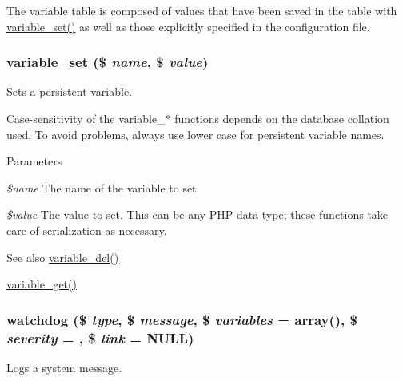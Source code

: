 The variable table is composed of values that have been saved in the table with \hyperlink{bootstrap_8inc_a9859faa6fcd56ca6048be93dace95999}{variable\_\-set()} as well as those explicitly specified in the configuration file. \hypertarget{bootstrap_8inc_a9859faa6fcd56ca6048be93dace95999}{
\subsubsection[{variable\_\-set}]{\setlength{\rightskip}{0pt plus 5cm}variable\_\-set (\$ {\em name}, \/  \$ {\em value})}}
\label{bootstrap_8inc_a9859faa6fcd56ca6048be93dace95999}
Sets a persistent variable.

Case-\/sensitivity of the variable\_\-$\ast$ functions depends on the database collation used. To avoid problems, always use lower case for persistent variable names.


\begin{DoxyParams}{Parameters}
\item[{\em \$name}]The name of the variable to set. \item[{\em \$value}]The value to set. This can be any PHP data type; these functions take care of serialization as necessary.\end{DoxyParams}
\begin{DoxySeeAlso}{See also}
\hyperlink{bootstrap_8inc_a7850bff5f313f85335f418e6d87606b1}{variable\_\-del()} 

\hyperlink{bootstrap_8inc_a1be2160d5e5a1a9b9a0c90944c4f5252}{variable\_\-get()} 
\end{DoxySeeAlso}
\hypertarget{bootstrap_8inc_acb7338e6740302727043d64e3ae1257b}{
\subsubsection[{watchdog}]{\setlength{\rightskip}{0pt plus 5cm}watchdog (\$ {\em type}, \/  \$ {\em message}, \/  \$ {\em variables} = {\ttfamily array()}, \/  \$ {\em severity} = {}, \/  \$ {\em link} = {\ttfamily NULL})}}
\label{bootstrap_8inc_acb7338e6740302727043d64e3ae1257b}
Logs a system message.


